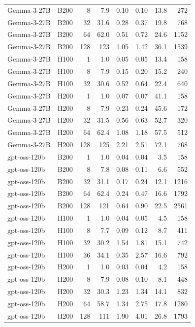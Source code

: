 \begin{longtable}{llrrrrrr}
Gemma-3-27B & B200 & 8 & 7.9 & 0.10 & 0.10 & 13.8 & 272 \\
Gemma-3-27B & B200 & 32 & 31.6 & 0.28 & 0.37 & 19.8 & 768 \\
Gemma-3-27B & B200 & 64 & 62.0 & 0.51 & 0.72 & 24.6 & 1152 \\
Gemma-3-27B & B200 & 128 & 123 & 1.05 & 1.42 & 36.1 & 1539 \\
Gemma-3-27B & H100 & 1 & 1.0 & 0.05 & 0.05 & 13.4 & 158 \\
Gemma-3-27B & H100 & 8 & 7.9 & 0.15 & 0.20 & 15.2 & 240 \\
Gemma-3-27B & H100 & 32 & 30.6 & 0.52 & 0.64 & 22.4 & 640 \\
Gemma-3-27B & H200 & 1 & 1.0 & 0.07 & 0.07 & 41.1 & 158 \\
Gemma-3-27B & H200 & 8 & 7.9 & 0.23 & 0.24 & 45.6 & 172 \\
Gemma-3-27B & H200 & 32 & 31.5 & 0.56 & 0.63 & 52.7 & 320 \\
Gemma-3-27B & H200 & 64 & 62.4 & 1.08 & 1.18 & 57.5 & 512 \\
Gemma-3-27B & H200 & 128 & 125 & 2.21 & 2.51 & 72.1 & 768 \\
gpt-oss-120b & B200 & 1 & 1.0 & 0.04 & 0.04 & 3.5 & 158 \\
gpt-oss-120b & B200 & 8 & 7.8 & 0.08 & 0.11 & 6.6 & 552 \\
gpt-oss-120b & B200 & 32 & 31.1 & 0.17 & 0.24 & 12.1 & 1216 \\
gpt-oss-120b & B200 & 64 & 62.4 & 0.24 & 0.47 & 16.6 & 1792 \\
gpt-oss-120b & B200 & 128 & 121 & 0.64 & 0.90 & 22.5 & 2561 \\
gpt-oss-120b & H100 & 1 & 1.0 & 0.04 & 0.05 & 4.5 & 158 \\
gpt-oss-120b & H100 & 8 & 7.7 & 0.09 & 0.12 & 8.7 & 411 \\
gpt-oss-120b & H100 & 32 & 30.2 & 1.54 & 1.81 & 15.1 & 742 \\
gpt-oss-120b & H100 & 36 & 34.1 & 0.35 & 2.57 & 16.6 & 792 \\
gpt-oss-120b & H200 & 1 & 1.0 & 0.03 & 0.04 & 4.2 & 158 \\
gpt-oss-120b & H200 & 8 & 7.9 & 0.08 & 0.10 & 8.1 & 448 \\
gpt-oss-120b & H200 & 32 & 30.3 & 1.23 & 1.34 & 14.1 & 832 \\
gpt-oss-120b & H200 & 64 & 58.7 & 1.34 & 2.75 & 17.8 & 1280 \\
gpt-oss-120b & H200 & 128 & 111 & 1.90 & 4.01 & 26.8 & 1793 \\

\end{longtable}
